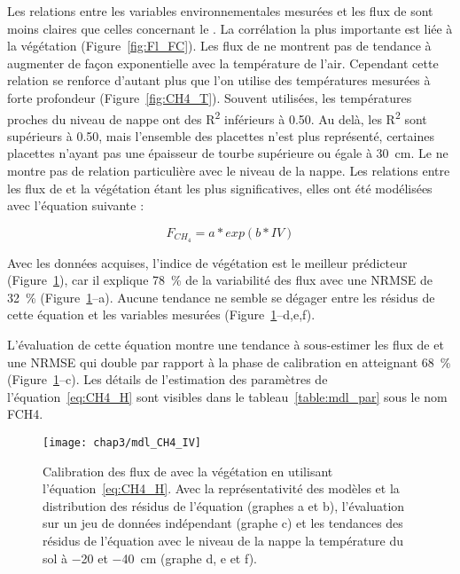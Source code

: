 Les relations entre les variables environnementales mesurées et les flux de \chh sont moins claires que celles concernant le \coo.
La corrélation la plus importante est liée à la végétation (Figure~\ref{fig:Fl_FC}).
Les flux de \chh ne montrent pas de tendance à augmenter de façon exponentielle avec la température de l'air.
Cependant cette relation se renforce d'autant plus que l'on utilise des températures mesurées à forte profondeur (Figure~\ref{fig:CH4_T}).
Souvent utilisées, les températures proches du niveau de nappe ont des R\textsuperscript{2} inférieurs à \num{0.50}.
Au delà, les R\textsuperscript{2} sont supérieurs à \num{0.50}, mais l'ensemble des placettes n'est plus représenté, certaines placettes n'ayant pas une épaisseur de tourbe supérieure ou égale à \SI{30}{\centi\metre}.
Le \chh ne montre pas de relation particulière avec le niveau de la nappe.
Les relations entre les flux de \chh et la végétation étant les plus significatives, elles ont été modélisées avec l'équation suivante :

\begin{equation} \label{eq:CH4_H}
F_{CH_{4}} = a*exp(b*IV)
\end{equation}

Avec les données acquises, l'indice de végétation est le meilleur prédicteur (Figure~\ref{fig:CH4_mdl}), car il explique \SI{78}{\percent} de la variabilité des flux \chh avec une NRMSE de \SI{32}{\percent} (Figure~\ref{fig:CH4_mdl}--a).
Aucune tendance ne semble se dégager entre les résidus de cette équation et les variables mesurées (Figure~\ref{fig:CH4_mdl}--d,e,f).

L'évaluation de cette équation montre une tendance à sous-estimer les flux de \chh et une NRMSE qui double par rapport à la phase de calibration en atteignant \SI{68}{\percent} (Figure~\ref{fig:CH4_mdl}--c).
Les détails de l'estimation des paramètres de l'équation~\ref{eq:CH4_H} sont visibles dans le tableau~\ref{table:mdl_par} sous le nom FCH4.

\begin{figure}
\centering
\texttt{[image: chap3/mdl\_CH4\_IV]}
\caption{Calibration des flux de \chh avec la végétation en utilisant l'équation~\ref{eq:CH4_H}. Avec la représentativité des modèles et la distribution des résidus de l'équation (graphes a et b), l'évaluation sur un jeu de données indépendant (graphe c) et les tendances des résidus de l'équation avec le niveau de la nappe la température du sol à \num{-20} et \SI{-40}{\centi\metre} (graphe d, e et f).}
\label{fig:CH4_mdl}
\end{figure}




